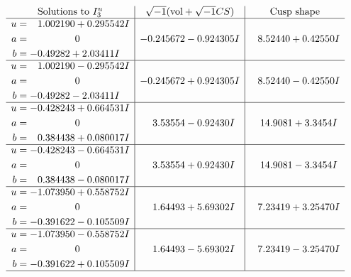 \documentclass[1p]{elsarticle_modified}
\theoremstyle{definition}
\newcommand{\I}{\sqrt{-1}}
\begin{document}
$$\begin{array}{c|c|c}  
\text{Solutions to }I^u_{3}& \I (\text{vol} + \sqrt{-1}CS) & \text{Cusp shape}\\
 \hline 
\begin{aligned}
u &= \phantom{-}1.002190 + 0.295542 I \\
a &= \phantom{-0.000000 } 0 \\
b &= -0.49282 + 2.03411 I\end{aligned}
 & -0.245672 - 0.924305 I & \phantom{-}8.52440 + 0.42550 I \\ \hline\begin{aligned}
u &= \phantom{-}1.002190 - 0.295542 I \\
a &= \phantom{-0.000000 } 0 \\
b &= -0.49282 - 2.03411 I\end{aligned}
 & -0.245672 + 0.924305 I & \phantom{-}8.52440 - 0.42550 I \\ \hline\begin{aligned}
u &= -0.428243 + 0.664531 I \\
a &= \phantom{-0.000000 } 0 \\
b &= \phantom{-}0.384438 + 0.080017 I\end{aligned}
 & \phantom{-}3.53554 - 0.92430 I & \phantom{-}14.9081 + 3.3454 I \\ \hline\begin{aligned}
u &= -0.428243 - 0.664531 I \\
a &= \phantom{-0.000000 } 0 \\
b &= \phantom{-}0.384438 - 0.080017 I\end{aligned}
 & \phantom{-}3.53554 + 0.92430 I & \phantom{-}14.9081 - 3.3454 I \\ \hline\begin{aligned}
u &= -1.073950 + 0.558752 I \\
a &= \phantom{-0.000000 } 0 \\
b &= -0.391622 - 0.105509 I\end{aligned}
 & \phantom{-}1.64493 + 5.69302 I & \phantom{-}7.23419 + 3.25470 I \\ \hline\begin{aligned}
u &= -1.073950 - 0.558752 I \\
a &= \phantom{-0.000000 } 0 \\
b &= -0.391622 + 0.105509 I\end{aligned}
 & \phantom{-}1.64493 - 5.69302 I & \phantom{-}7.23419 - 3.25470 I\\
 \hline 
 \end{array}$$\newpage
\end{document}
